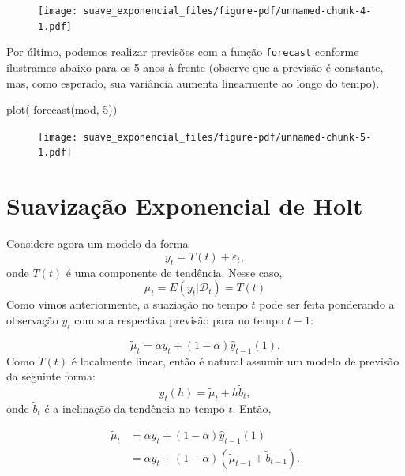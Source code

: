 \documentclass[
  letterpaper,
  DIV=11,
  numbers=noendperiod]{scrartcl}
\newenvironment{Shaded}{\begin{snugshade}}{\end{snugshade}}
\newcommand{\DecValTok}[1]{\textcolor[rgb]{0.68,0.00,0.00}{#1}}
\newcommand{\FunctionTok}[1]{\textcolor[rgb]{0.28,0.35,0.67}{#1}}
\newcommand{\NormalTok}[1]{\textcolor[rgb]{0.00,0.23,0.31}{#1}}
\theoremstyle{plain}
\theoremstyle{plain}
\theoremstyle{definition}
\theoremstyle{definition}
\theoremstyle{remark}
\begin{document}
\begin{figure}[H]

{\centering \texttt{[image: suave\_exponencial\_files/figure-pdf/unnamed-chunk-4-1.pdf]}

}

\end{figure}

Por último, podemos realizar previsões com a função \texttt{forecast}
conforme ilustramos abaixo para os 5 anos à frente (observe que a
previsão é constante, mas, como esperado, sua variância aumenta
linearmente ao longo do tempo).

\begin{Shaded}
\begin{Highlighting}[]
\FunctionTok{plot}\NormalTok{( }\FunctionTok{forecast}\NormalTok{(mod, }\DecValTok{5}\NormalTok{))}
\end{Highlighting}
\end{Shaded}

\begin{figure}[H]

{\centering \texttt{[image: suave\_exponencial\_files/figure-pdf/unnamed-chunk-5-1.pdf]}

}

\end{figure}

\hypertarget{suavizauxe7uxe3o-exponencial-de-holt}{%
\section{Suavização Exponencial de
Holt}\label{suavizauxe7uxe3o-exponencial-de-holt}}

Considere agora um modelo da forma \[y_t = T(t) + \varepsilon_t,\] onde
\(T(t)\) é uma componente de tendência. Nesse caso,
\[\mu_t=E(y_t|\mathcal{D}_t)=T(t)\] Como vimos anteriormente, a
suaziação no tempo \(t\) pode ser feita ponderando a observação \(y_t\)
com sua respectiva previsão para no tempo \(t-1\):

\[\tilde{\mu}_t=\alpha y_t + (1-\alpha)\hat{y}_{t-1}(1).\] Como \(T(t)\)
é localmente linear, então é natural assumir um modelo de previsão da
seguinte forma: \[y_t(h)= \tilde{\mu}_t+ h\tilde{b}_t,\] onde
\(\tilde{b}_t\) é a inclinação da tendência no tempo \(t\). Então,

\[\begin{align*}
    \tilde{\mu}_t &= \alpha y_t + (1-\alpha)\hat{y}_{t-1}(1) \\ 
    &=\alpha y_t + (1-\alpha)\left( \tilde{\mu}_{t-1} + \tilde{b}_{t-1}\right).
    \end{align*}\]
\end{document}
